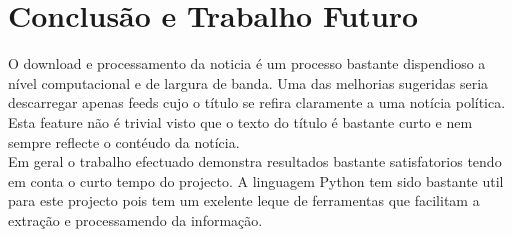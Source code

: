 \section{Conclusão e Trabalho Futuro}
O download e processamento da noticia é um processo bastante dispendioso a nível computacional e de largura de banda. Uma das melhorias sugeridas seria descarregar apenas feeds cujo o título se refira claramente a uma notícia política. Esta feature não é trivial visto que o texto do título é bastante curto e nem sempre reflecte o contéudo da notícia.\\
Em geral o trabalho efectuado demonstra resultados bastante satisfatorios tendo em conta o curto tempo do projecto. A linguagem Python tem sido bastante util para este projecto pois tem um exelente leque de ferramentas que facilitam a extração e processamendo da informação.